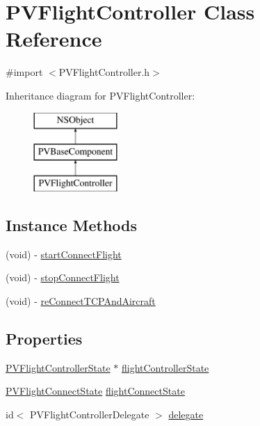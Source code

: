 \hypertarget{interface_p_v_flight_controller}{}\section{P\+V\+Flight\+Controller Class Reference}
\label{interface_p_v_flight_controller}


{\ttfamily \#import $<$P\+V\+Flight\+Controller.\+h$>$}

Inheritance diagram for P\+V\+Flight\+Controller\+:\begin{figure}[H]
\begin{center}
\leavevmode
\includegraphics[height=3.000000cm]{interface_p_v_flight_controller}
\end{center}
\end{figure}
\subsection*{Instance Methods}
\begin{DoxyCompactItemize}
\item 
(void) -\/ \hyperlink{group___p_v_s_d_k___c_o_r_e___a_p_i___f_l_i_g_h_t_c_o_n_t_r_o_l_ga54cce08ed7fbc63fd32a076ec8b2e3ed}{start\+Connect\+Flight}
\item 
(void) -\/ \hyperlink{group___p_v_s_d_k___c_o_r_e___a_p_i___f_l_i_g_h_t_c_o_n_t_r_o_l_gabedbf3ef8ff8e1402c56845059ab6667}{stop\+Connect\+Flight}
\item 
(void) -\/ \hyperlink{group___p_v_s_d_k___c_o_r_e___a_p_i___f_l_i_g_h_t_c_o_n_t_r_o_l_ga0440c5e54f3adc56334f72975cc18bcf}{re\+Connect\+T\+C\+P\+And\+Aircraft}
\end{DoxyCompactItemize}
\subsection*{Properties}
\begin{DoxyCompactItemize}
\item 
\hyperlink{interface_p_v_flight_controller_state}{P\+V\+Flight\+Controller\+State} $\ast$ \hyperlink{group___p_v_s_d_k___c_o_r_e___a_p_i___f_l_i_g_h_t_c_o_n_t_r_o_l_ga049b45174bb8ef2d3e286d75c8b2867a}{flight\+Controller\+State}
\item 
\hyperlink{_p_v_flight_controller_state_8h_a114bcb647c32c73c1dc06e9a9e302492}{P\+V\+Flight\+Connect\+State} \hyperlink{group___p_v_s_d_k___c_o_r_e___a_p_i___f_l_i_g_h_t_c_o_n_t_r_o_l_gaa07ec3ee333e95a545483b099f6f3bce}{flight\+Connect\+State}
\item 
id$<$ P\+V\+Flight\+Controller\+Delegate $>$ \hyperlink{group___p_v_s_d_k___c_o_r_e___a_p_i___f_l_i_g_h_t_c_o_n_t_r_o_l_ga8059edb708930a8ac1acce2aa1c7fcc1}{delegate}
\end{DoxyCompactItemize}
